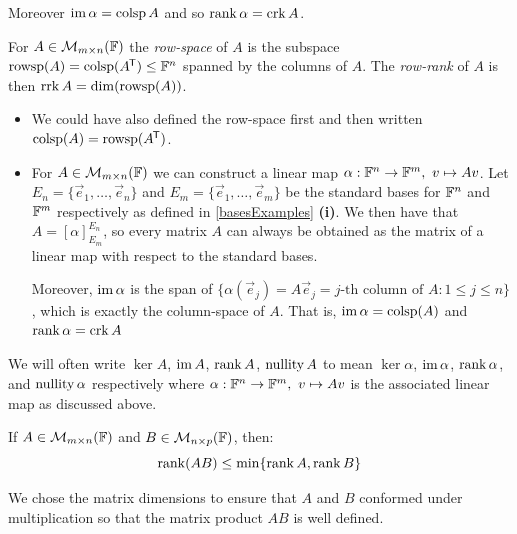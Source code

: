 \documentclass[../main.tex]{subfiles}
\begin{document}
\begin{remark}
  Moreover $\operatorname{im} \alpha = \operatorname{colsp} A$ and so $\operatorname{rank} \alpha = \operatorname{crk} A$.
\end{remark}
\begin{definition}
  For $A \in \mathcal{M}_{m \times n}(\mathbb{F})$ the \textit{row-space} of $A$ is the subspace $\operatorname{rowsp}(A) = \operatorname{colsp}(A^{{\mkern-1.5mu\mathsf{T}}}) \leq \mathbb{F}^n$ spanned by the columns of $A$.
  The \textit{row-rank} of $A$ is then $\operatorname{rrk} A = \dim(\operatorname{rowsp}(A))$.
\end{definition}
\begin{remark}[Remarks]
  \begin{itemize}
    \item We could have also defined the row-space first and then written $\operatorname{colsp}(A) = \operatorname{rowsp}(A^{{\mkern-1.5mu\mathsf{T}}})$.
    \item For $A \in \mathcal{M}_{m \times n}(\mathbb{F})$ we can construct a linear map $\alpha: \mathbb{F}^n \to \mathbb{F}^m,\ v \mapsto Av$.
      Let $E_n = \{\vec{e}_1, \ldots, \vec{e}_n\}$ and $E_m = \{\vec{e}_1, \ldots, \vec{e}_m\}$ be the standard bases for $\mathbb{F}^n$ and $\mathbb{F}^m$ respectively as defined in \cref{basesExamples} \textbf{(i)}.
      We then have that $A = [\alpha]^{E_n}_{E_m}$, so every matrix $A$ can always be obtained as the matrix of a linear map with respect to the standard bases.

      Moreover, $\operatorname{im} \alpha$ is the span of $\{\alpha(\vec{e}_j) = A\vec{e}_j = \text{$j$-th column of $A$}: 1 \leq j \leq n\}$, which is exactly the column-space of $A$.
      That is, $\operatorname{im} \alpha = \operatorname{colsp}(A)$ and $\operatorname{rank} \alpha = \operatorname{crk} A$
  \end{itemize}
\end{remark}
\begin{remark}[Notation]
  We will often write $\ker A$, $\operatorname{im} A$, $\operatorname{rank} A$, $\operatorname{nullity} A$ to mean $\ker \alpha$, $\operatorname{im} \alpha$, $\operatorname{rank} \alpha$, and $\operatorname{nullity} \alpha$ respectively where $\alpha: \mathbb{F}^n \to \mathbb{F}^m,\ v \mapsto Av$ is the associated linear map as discussed above.
\end{remark}
\begin{lemma}
  If $A \in \mathcal{M}_{m \times n}(\mathbb{F})$ and $B \in \mathcal{M}_{n \times p}(\mathbb{F})$, then: \label{rankProdIneq}
  \[
    \operatorname{rank}(AB) \leq \min\{\operatorname{rank} A, \operatorname{rank} B\}
  \]
\end{lemma}
\begin{remark}[Note]
  We chose the matrix dimensions to ensure that $A$ and $B$ conformed under multiplication so that the matrix product $AB$ is well defined.
\end{remark}
\end{document}
